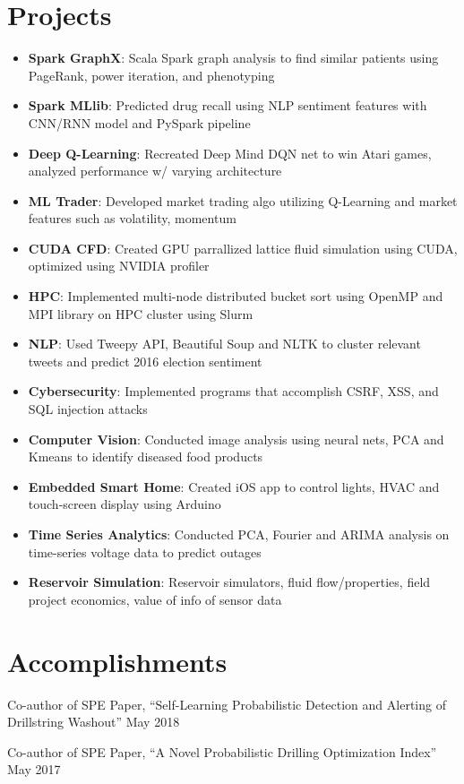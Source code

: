 \documentclass[letterpaper,11pt]{article}
\newcommand{\resumeItem}[2]{
  \item\small{
    \textbf{#1}{: #2 \vspace{-2pt}}
  }
}
\newcommand{\resumeSubItem}[2]{\resumeItem{#1}{#2}\vspace{-4pt}}
\newcommand{\resumeSubHeadingListStart}{\begin{itemize}[leftmargin=*]}
\newcommand{\resumeSubHeadingListEnd}{\end{itemize}}
\begin{document}
\section{Projects}
  \resumeSubHeadingListStart
    \resumeSubItem{Spark GraphX}
      {Scala Spark graph analysis to find similar patients using PageRank, power iteration, and phenotyping}
    \resumeSubItem{Spark MLlib}
      {Predicted drug recall using NLP sentiment features with CNN/RNN model and PySpark pipeline}
    \resumeSubItem{Deep Q-Learning}
      {Recreated Deep Mind DQN net to win Atari games, analyzed performance w/ varying architecture}
    \resumeSubItem{ML Trader}
      {Developed market trading algo utilizing Q-Learning and market features such as volatility, momentum}
    \resumeSubItem{CUDA CFD}
      {Created GPU parrallized lattice fluid simulation using CUDA, optimized using NVIDIA profiler}
    \resumeSubItem{HPC}
      {Implemented multi-node distributed bucket sort using OpenMP and MPI library on HPC cluster using Slurm}
    \resumeSubItem{NLP}
      {Used Tweepy API, Beautiful Soup and NLTK to cluster relevant tweets and predict 2016 election sentiment}
    \resumeSubItem{Cybersecurity}
      {Implemented programs that accomplish CSRF, XSS, and SQL injection attacks}     
    \resumeSubItem{Computer Vision}
      {Conducted image analysis using neural nets, PCA and Kmeans to identify diseased food products}
    \resumeSubItem{Embedded Smart Home}
      {Created iOS app to control lights, HVAC and touch-screen display using Arduino}
    \resumeSubItem{Time Series Analytics}
      {Conducted PCA, Fourier and ARIMA analysis on time-series voltage data to predict outages}
    \resumeSubItem{Reservoir Simulation}
      {Reservoir simulators, fluid flow/properties, field project economics, value of info of sensor data}          
  \resumeSubHeadingListEnd
  \vspace{1pt}
\section{Accomplishments }
    \vspace{-5pt}\item{Co-author of SPE Paper, ``Self-Learning Probabilistic Detection and Alerting of Drillstring Washout'' \hfill May 2018
    }\\
    \vspace{-5pt}\item{Co-author of SPE Paper, ``A Novel Probabilistic Drilling Optimization Index'' \hfill May 2017}\\
\end{document}
